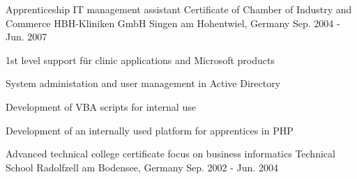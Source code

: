 

\begin{cventries}

  \cventry
    {Apprenticeship IT management assistant Certificate of Chamber of Industry and Commerce} %
    {HBH-Kliniken GmbH} %
    {Singen am Hohentwiel, Germany} %
    {Sep. 2004 - Jun. 2007} %
    {
      \begin{cvitems} %
        \item {1st level support für clinic applications and Microsoft products}
        \item {System administation and user management in Active Directory}
        \item {Development of VBA scripts for internal use}
        \item {Development of an internally used platform for apprentices in PHP}
      \end{cvitems}
    }

  \cventry
    {Advanced technical college certificate focus on business informatics} %
    {Technical School} %
    {Radolfzell am Bodensee, Germany} %
    {Sep. 2002 - Jun. 2004} %
    {}

\end{cventries}
